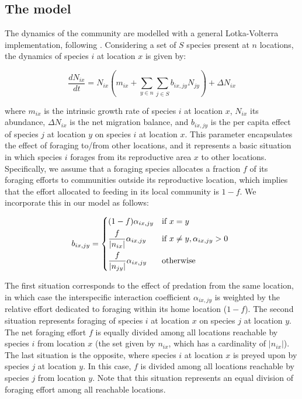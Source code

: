 \subsection*{The model}

The dynamics of the community are modelled with a general Lotka-Volterra implementation, following \cite{Gravel2016a}. Considering a set of $S$ species present at $n$ locations, the dynamics of species $i$ at location $x$ is given by:

\begin{equation}
\frac{dN_{ix}}{dt} = N_{ix}(m_{ix} + \sum_{y \in n} \sum_{j \in S} b_{ix,jy} N_{jy}) + \Delta N_{ix}
\end{equation}

where $m_{ix}$ is the intrinsic growth rate of species $i$ at location $x$, $N_{ix}$ its abundance, $\Delta N_{ix}$ is the net migration balance, and $b_{ix,jy}$ is the per capita effect of species $j$ at location $y$ on species $i$ at location $x$. This parameter encapsulates the effect of foraging to/from other locations, and it represents a basic situation in which species $i$ forages from its reproductive area $x$ to other locations. Specifically, we assume that a foraging species allocates a fraction $f$ of its foraging efforts to communities outside its reproductive location, which implies that the effort allocated to feeding in its local community is $1-f$. We incorporate this in our model as follows:

\begin{equation}
b_{ix,jy} =
\begin{dcases*}
   (1-f)\alpha_{ix,jy}        		& if $x = y$ \\
   \frac{f}{\vert n_{ix} \vert}\alpha_{ix,jy}     & if $x \neq y, \alpha_{ix,jy} > 0$ \\
   \frac{f}{\vert n_{jy} \vert} \alpha_{ix,jy}    & otherwise
\end{dcases*}
\end{equation}

The first situation corresponds to the effect of predation from the same location, in which case the interspecific interaction coefficient $\alpha_{ix,jy}$ is weighted by the relative effort dedicated to foraging within its home location ($1-f$). The second situation represents foraging of species $i$ at location $x$ on species $j$ at location $y$. The net foraging effort $f$ is equally divided among all locations reachable by species $i$ from location $x$ (the set given by $n_{ix}$, which has a cardinality of $\vert n_{ix} \vert$). The last situation is the opposite, where species $i$ at location $x$ is preyed upon by species $j$ at location $y$. In this case, $f$ is divided among all locations reachable by species $j$ from location $y$. Note that this situation represents an equal division of foraging effort among all reachable locations.

